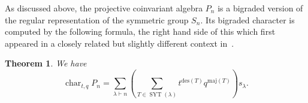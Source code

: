 \documentclass[a4paper,11pt]{amsart}
\theoremstyle{plain}
\newtheorem{theorem}{Theorem}[section]
\theoremstyle{definition}
\DeclareMathOperator{\cha}{char}
\DeclareMathOperator{\SYT}{SYT}
\begin{document}
As discussed above, the projective coinvariant algebra $P_n$ is a bigraded version of the regular representation of the symmetric group $S_n$. Its bigraded character is computed by the following formula, the right hand side of this which first appeared in a closely related but slightly different context in~\cite[Prop.3.14]{RSW}.
\begin{theorem} \label{thm:char} We have 
\[ %
\cha_{t,q} P_n  =   \sum_{\lambda\vdash n} \left(\sum_{T\in\SYT(\lambda)} t^{\mathrm{des}(T)}q^{\mathrm{maj}(T)}\right)s_\lambda.
\]
\end{theorem}
\end{document}
